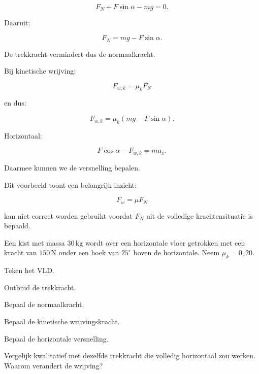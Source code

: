 \documentclass{ximera}
\begin{document}
\[
F_N+F\sin\alpha-mg=0.
\]

Daaruit:

\[
\boxed{
F_N=mg-F\sin\alpha.
}
\]

De trekkracht vermindert dus de normaalkracht.

Bij kinetische wrijving:

\[
F_{w,k}=\mu_kF_N
\]

en dus:

\[
F_{w,k}
=
\mu_k(mg-F\sin\alpha).
\]

Horizontaal:

\[
F\cos\alpha-F_{w,k}=ma_x.
\]

Daarmee kunnen we de versnelling bepalen.

Dit voorbeeld toont een belangrijk inzicht:

\[
\boxed{
F_w=\mu F_N
}
\]

kan niet correct worden gebruikt voordat $F_N$ uit de volledige
krachtensituatie is bepaald.


\begin{oefening}{\oefU\ESS}

Een kist met massa $30\,\mathrm{kg}$ wordt over een horizontale vloer
getrokken met een kracht van $150\,\mathrm N$ onder een hoek van
$25^\circ$ boven de horizontale. Neem $\mu_k=0,20$.

\begin{question}
Teken het VLD.
\end{question}

\begin{question}
Ontbind de trekkracht.
\end{question}

\begin{question}
Bepaal de normaalkracht.
\end{question}

\begin{question}
Bepaal de kinetische wrijvingskracht.
\end{question}

\begin{question}
Bepaal de horizontale versnelling.
\end{question}

\begin{question}
Vergelijk kwalitatief met dezelfde trekkracht die volledig horizontaal
zou werken. Waarom verandert de wrijving?
\end{question}

\end{oefening}
\end{document}
